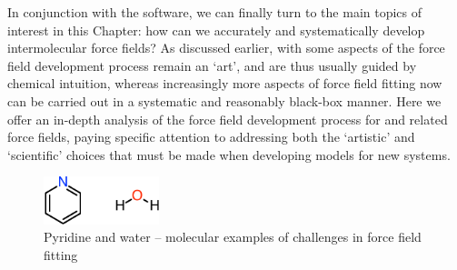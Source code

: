 In conjunction with the \pointer software, we can finally turn to the
main topics of interest in this Chapter: how can we accurately and
systematically develop intermolecular force fields? As discussed earlier,
with \mastiff
some aspects of the force field development process remain an `art', and are thus
usually guided by chemical intuition, whereas increasingly more aspects of force field
fitting now can be carried out in a systematic and reasonably black-box manner. Here
we offer an in-depth analysis of the force field development process for
\mastiff and related force fields, paying
specific attention to addressing both the `artistic' and `scientific' choices
that must be made when developing models for new systems. 

\begin{figure}
\centering
\includegraphics[width=0.3\textwidth]{pointer/molecules.pdf}
\caption{Pyridine and water -- molecular examples of challenges in force field fitting}
\label{fig:pointer-molecules}
\end{figure}

